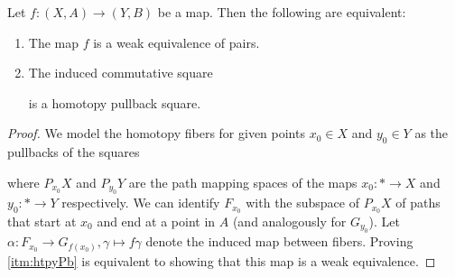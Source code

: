 \begin{lemma}\label{lem:weOfaPairsIsHtpyPb}
    Let $f\colon(X,A)\to (Y,B)$ be a map.
    Then the following are equivalent:
    \begin{enumerate}[label={(\roman*)}]
        \item The map $f$ is a weak equivalence of pairs. \label{itm:weOfPairs}
        \item The induced commutative square \begin{center} 
        \end{center}
        is a homotopy pullback square. \label{itm:htpyPb}
    \end{enumerate}
    \begin{proof}
        We model the homotopy fibers for given points $x_0\in X$ and $y_0\in Y$ as the pullbacks of the squares
        \begin{center} 
        \end{center}
        where $P_{x_0}X$ and $P_{y_0}Y$ are the path mapping spaces of the maps $x_0\colon *\to X$ and  $y_0\colon *\to Y$ respectively.
        We can identify $F_{x_0}$ with the subspace of $P_{x_0}X$ of paths that start at $x_0$ and end at a point in $A$ (and analogously for $G_{y_0}$).
        Let $\alpha\colon F_{x_0}\to G_{f(x_0)}, \gamma\mapsto f\gamma$ denote the induced map between fibers.
        Proving \ref{itm:htpyPb} is equivalent to showing that this map is a weak equivalence.


\end{proof}
\end{lemma}
